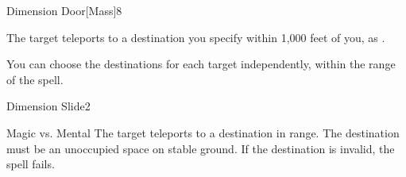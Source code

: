 \begin{spellsection}{Dimension Door}[Mass]{8}
    \begin{spellheader}
    \end{spellheader}
    \begin{spellcontent}
        \begin{spelltargetinginfo}
            \spellrng{\rngmed}
        \end{spelltargetinginfo}
        \begin{spelleffects}
            \spelleffect The target teleports to a destination you specify within 1,000 feet of you, as .
        \end{spelleffects}
    \end{spellcontent}
    \begin{spellfooter}
        \spellnotes You can choose the destinations for each target independently, within the range of the spell. 
        \miscastexplode
    \end{spellfooter}
\end{spellsection}

\begin{spellsection}{Dimension Slide}{2}
    \begin{spellheader}
    \end{spellheader}
    \begin{spellcontent}
        \begin{spelltargetinginfo}
        \end{spelltargetinginfo}
        \begin{spelleffects}
            \begin{spellattack}{Magic vs. Mental}
                \spelleffect The target teleports to a destination in range. The destination must be an unoccupied space on stable ground. If the destination is invalid, the spell fails.
            \end{spellattack}
        \end{spelleffects}
    \end{spellcontent}
    \begin{spellfooter}
        \miscastrandom
    \end{spellfooter}
\end{spellsection}

